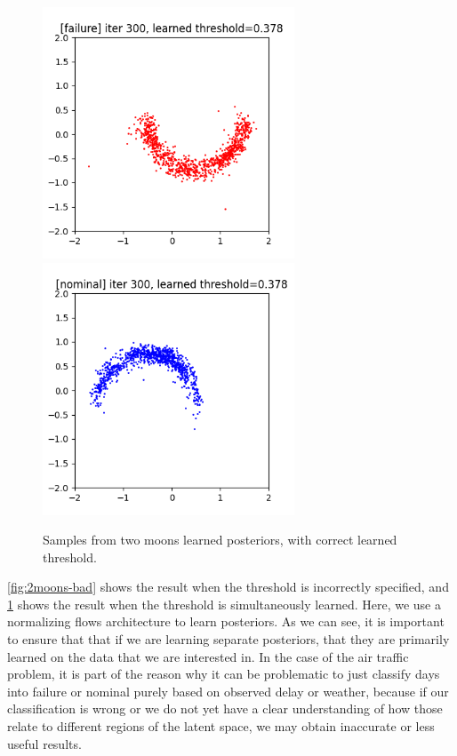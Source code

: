 \begin{figure}[htb!]
    \centering
    \includegraphics[height=7.5cm]{media/Figure_1.300.png}
    \includegraphics[height=7.5cm]{media/Figure_2.300.png}
    \caption{Samples from two moons learned posteriors, with correct learned threshold.}
    \label{fig:2moons-good}
\end{figure}

\cref{fig:2moons-bad} shows the result when the threshold is incorrectly specified, and \cref{fig:2moons-good} shows the result when the threshold is simultaneously learned. Here, we use a normalizing flows architecture to learn posteriors. As we can see, it is important to ensure that that if we are learning separate posteriors, that they are primarily learned on the data that we are interested in. In the case of the air traffic problem, it is part of the reason why it can be problematic to just classify days into failure or nominal purely based on observed delay or weather, because if our classification is wrong or we do not yet have a clear understanding of how those relate to different regions of the latent space, we may obtain inaccurate or less useful results.